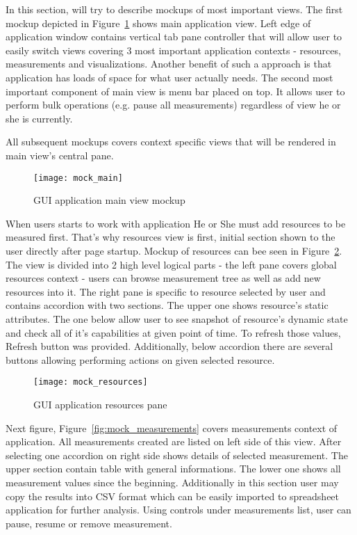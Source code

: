In this section, will try to describe mockups of most important views. The first mockup depicted in
Figure~\ref{fig:mock_main} shows main application view. Left edge of application window contains vertical tab pane
controller that will allow user to easily switch views covering 3 most important application contexts - resources,
measurements and visualizations. Another benefit of such a approach is that application has loads of space for what
user actually needs. The second most important component of main view is menu bar placed on top. It allows user
to perform bulk operations (e.g. pause all measurements) regardless of view he or she is currently. 

All subsequent mockups covers context specific views that will be rendered in main view's central pane.



\begin{figure}[ht]
  \centering
  \texttt{[image: mock\_main]}
  \caption{GUI application main view mockup}
  \label{fig:mock_main}
\end{figure}

When users starts to work with application He or She must add resources to be measured first. That's why resources view
is first, initial section shown to the user directly after page startup. Mockup of resources can bee seen in
Figure~\ref{fig:mock_resources}. The view is divided into 2 high level logical parts - the left pane covers global
resources context - users can browse measurement tree as well as add new resources into it. The right pane is specific
to resource selected by user and contains accordion with two sections. The upper one shows resource's static
attributes. The one below allow user to see snapshot of resource's dynamic state and check all of it's capabilities at
given point of time. To refresh those values, Refresh button was provided. Additionally, below accordion there are
several buttons allowing performing actions on given selected resource.

\begin{figure}[ht]
  \centering
  \texttt{[image: mock\_resources]}
  \caption{GUI application resources pane}
  \label{fig:mock_resources}
\end{figure}

Next figure, Figure~\ref{fig:mock_measurements} covers measurements context of application. All measurements created
are listed on left side of this view. After selecting one accordion on right side shows details of selected
measurement. The upper section contain table with general informations. The lower one shows all measurement values
since the beginning. Additionally in this section user may copy the results into CSV format which can be easily
imported to spreadsheet application for further analysis. Using controls under measurements list, user can
pause, resume or remove measurement.

